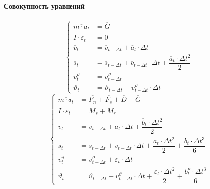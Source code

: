 \documentclass[c]{beamer}  %
\begin{document}
\begin{frame}
\frametitle{\insertsection} 
\framesubtitle{Совокупность уравнений}
 {
\[
\left\lbrace
\begin{aligned}
\overline{m \cdot a_t} &= \overline{G}\\
\overline{I \cdot \varepsilon_t} &= 0\\
\overline{v}_{t} &= \overline{v}_{t - \Delta t} + \overline{a}_t \cdot \Delta t \\
\overline{s}_{t} &= \overline{s}_{t - \Delta t} + \overline{v}_{t - \Delta t} \cdot \Delta t + \dfrac{\overline{a}_t \cdot \Delta t^2}{2} \\
v_{t}^{\vartheta} &= v^{\vartheta}_{t - \Delta t}  \\
\vartheta_{t} &= \vartheta_{t - \Delta t} + v^{\vartheta}_{t - \Delta t} \cdot \Delta t
\end{aligned}
\right.
\]
} 
{
\[
\left\lbrace
\begin{aligned}
\overline{m \cdot a_t} &= \overline{F_n} + \overline{F_s} + \overline{D} + \overline{G}\\
\overline{I \cdot \varepsilon_t} &= \overline{M_s} + \overline{M_r}\\
\overline{v}_{t} &= \overline{v}_{t - \Delta t} + \overline{a}_t \cdot \Delta t + \dfrac{\overline{b}_t \cdot \Delta t^2}{2} \\
\overline{s}_{t} &= \overline{s}_{t - \Delta t} + \overline{v}_{t - \Delta t} \cdot \Delta t + \dfrac{\overline{a}_t \cdot \Delta t^2}{2} +  \dfrac{\overline{b}_t \cdot \Delta t^3}{6}\\
v_{t}^{\vartheta} &= v^{\vartheta}_{t - \Delta t} + \varepsilon_t \cdot \Delta t\\
\vartheta_{t} &= \vartheta_{t - \Delta t} + v^{\vartheta}_{t - \Delta t} \cdot \Delta t + \dfrac{\varepsilon_t \cdot \Delta t^2}{2} + \dfrac{b^{\vartheta}_t \cdot \Delta t^3}{6} 
\end{aligned}
\right.
\]
}


\end{frame}
\end{document}
